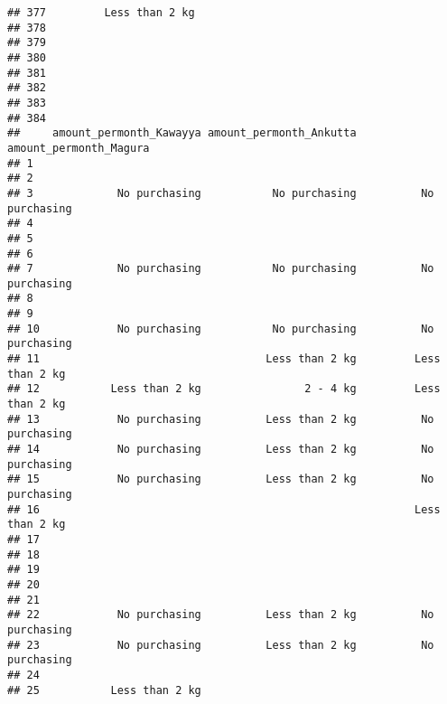\documentclass[
]{article}
\begin{document}
\begin{verbatim}
## 377         Less than 2 kg                                               
## 378                                                                      
## 379                                                                      
## 380                                                                      
## 381                                                                      
## 382                                                                      
## 383                                                                      
## 384                                                                      
##     amount_permonth_Kawayya amount_permonth_Ankutta amount_permonth_Magura
## 1                                                                         
## 2                                                                         
## 3             No purchasing           No purchasing          No purchasing
## 4                                                                         
## 5                                                                         
## 6                                                                         
## 7             No purchasing           No purchasing          No purchasing
## 8                                                                         
## 9                                                                         
## 10            No purchasing           No purchasing          No purchasing
## 11                                   Less than 2 kg         Less than 2 kg
## 12           Less than 2 kg                2 - 4 kg         Less than 2 kg
## 13            No purchasing          Less than 2 kg          No purchasing
## 14            No purchasing          Less than 2 kg          No purchasing
## 15            No purchasing          Less than 2 kg          No purchasing
## 16                                                          Less than 2 kg
## 17                                                                        
## 18                                                                        
## 19                                                                        
## 20                                                                        
## 21                                                                        
## 22            No purchasing          Less than 2 kg          No purchasing
## 23            No purchasing          Less than 2 kg          No purchasing
## 24                                                                        
## 25           Less than 2 kg                                               

\end{verbatim}
\end{document}
